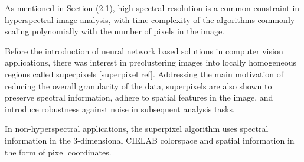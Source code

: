As mentioned in Section (2.1), high spectral resolution is a common constraint in hyperspectral image analysis, with time complexity of the algorithms commonly scaling polynomially with the number of pixels in the image. 

Before the introduction of neural network based solutions in computer vision applications, there was interest in preclustering images into locally homogeneous regions called superpixels [superpixel ref]. Addressing the main motivation of reducing the overall granularity of the data, superpixels are also shown to preserve spectral information, adhere to spatial features in the image, and introduce robustness against noise in subsequent analysis tasks.

In non-hyperspectral applications, the superpixel algorithm uses spectral information in the 3-dimensional CIELAB colorspace and spatial information in the form of pixel coordinates.

